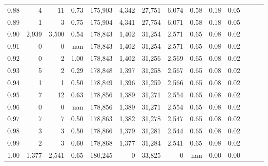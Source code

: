 \begin{tabular}{rrrrrrrrrrrrrr}
0.88 &       4 &     11 &  0.73 &  175,903 &    4,342 &  27,751 &   6,074 &  0.58 &  0.18 &      0.05 \\
0.89 &       1 &      3 &  0.75 &  175,904 &    4,341 &  27,754 &   6,071 &  0.58 &  0.18 &      0.05 \\
0.90 &   2,939 &  3,500 &  0.54 &  178,843 &    1,402 &  31,254 &   2,571 &  0.65 &  0.08 &      0.02 \\
0.91 &       0 &      0 &   nan &  178,843 &    1,402 &  31,254 &   2,571 &  0.65 &  0.08 &      0.02 \\
0.92 &       0 &      2 &  1.00 &  178,843 &    1,402 &  31,256 &   2,569 &  0.65 &  0.08 &      0.02 \\
0.93 &       5 &      2 &  0.29 &  178,848 &    1,397 &  31,258 &   2,567 &  0.65 &  0.08 &      0.02 \\
0.94 &       1 &      1 &  0.50 &  178,849 &    1,396 &  31,259 &   2,566 &  0.65 &  0.08 &      0.02 \\
0.95 &       7 &     12 &  0.63 &  178,856 &    1,389 &  31,271 &   2,554 &  0.65 &  0.08 &      0.02 \\
0.96 &       0 &      0 &   nan &  178,856 &    1,389 &  31,271 &   2,554 &  0.65 &  0.08 &      0.02 \\
0.97 &       7 &      7 &  0.50 &  178,863 &    1,382 &  31,278 &   2,547 &  0.65 &  0.08 &      0.02 \\
0.98 &       3 &      3 &  0.50 &  178,866 &    1,379 &  31,281 &   2,544 &  0.65 &  0.08 &      0.02 \\
0.99 &       2 &      3 &  0.60 &  178,868 &    1,377 &  31,284 &   2,541 &  0.65 &  0.08 &      0.02 \\
1.00 &   1,377 &  2,541 &  0.65 &  180,245 &        0 &  33,825 &       0 &   nan &  0.00 &      0.00 \\
\bottomrule
\end{tabular}
